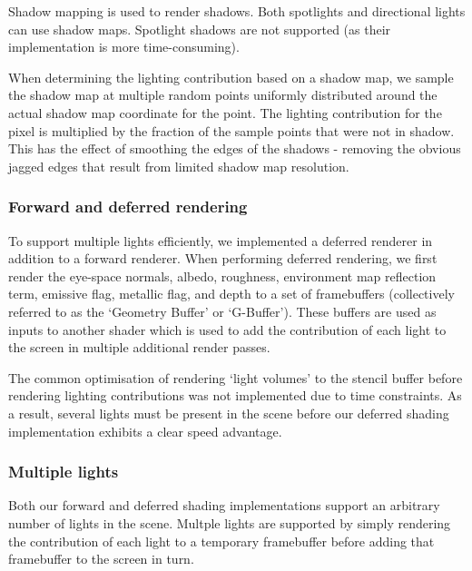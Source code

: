 \documentclass[11pt]{scrartcl} %
\begin{document}
            Shadow mapping is used to render shadows. Both spotlights and
            directional lights can use shadow maps. Spotlight shadows are not
            supported (as their implementation is more time-consuming).

            When determining the lighting contribution based on a shadow map,
            we sample the shadow map at multiple random points uniformly
            distributed around the actual shadow map coordinate for the point.
            The lighting contribution for the pixel is multiplied by the
            fraction of the sample points that were not in shadow. This has the
            effect of smoothing the edges of the shadows - removing the obvious
            jagged edges that result from limited shadow map resolution.

        \subsubsection{Forward and deferred rendering}

            To support multiple lights efficiently, we implemented a deferred
            renderer in addition to a forward renderer. When performing
            deferred rendering, we first render the eye-space normals, albedo,
            roughness, environment map reflection term, emissive flag, metallic
            flag, and depth to a set of framebuffers (collectively referred to
            as the `Geometry Buffer' or `G-Buffer'). These buffers are used as
            inputs to another shader which is used to add the contribution of
            each light to the screen in multiple additional render passes.


            The common optimisation of rendering `light volumes' to the stencil
            buffer before rendering lighting contributions was not implemented
            due to time constraints. As a result, several lights must be
            present in the scene before our deferred shading implementation
            exhibits a clear speed advantage.

        \subsubsection{Multiple lights}

            Both our forward and deferred shading implementations support an
            arbitrary number of lights in the scene. Multple lights are
            supported by simply rendering the contribution of each light to a
            temporary framebuffer before adding that framebuffer to the screen
            in turn.
\end{document}
